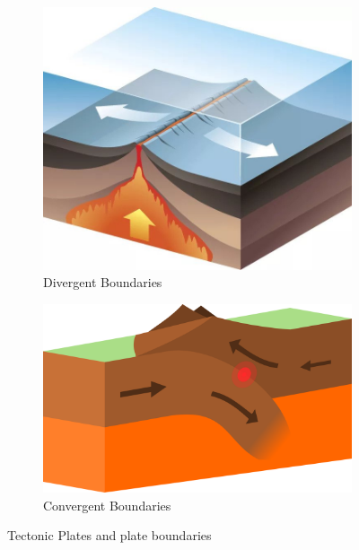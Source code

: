 \documentclass{article}
\begin{document}
\begin{figure}[H]
  \centering
  
  \begin{subfigure}[b]{0.45\textwidth}
    \centering
    \includegraphics[width=\textwidth]{img/divergent_boun.jpg}
    \caption{Divergent Boundaries}
    \label{fig:subfig1}
  \end{subfigure}
  \hfill
  \begin{subfigure}[b]{0.45\textwidth}
    \centering
    \includegraphics[width=\textwidth]{img/convergent_boun.png}
    \caption{Convergent Boundaries}
    \label{fig:subfig2}
  \end{subfigure}
  
  \caption{Tectonic Plates and plate boundaries}
  \label{fig:mainfig}
\end{figure}
\end{document}
